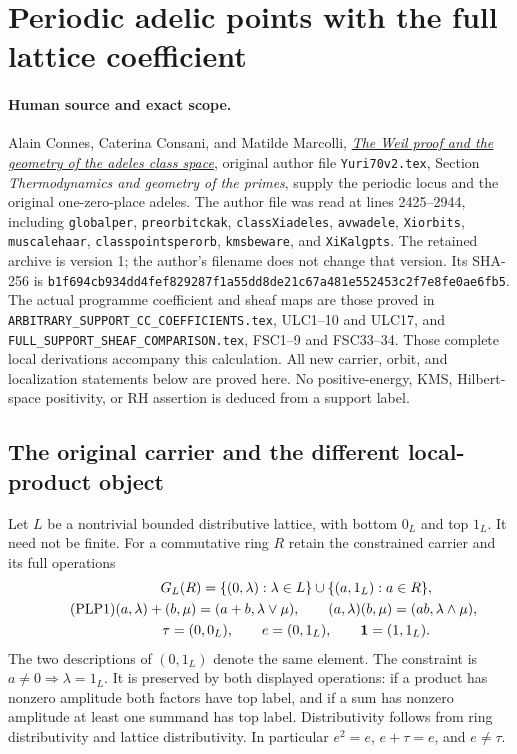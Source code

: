 \section{Periodic adelic points with the full lattice coefficient}
\label{sec:cc-periodic-full-lattice}

{\raggedright
\paragraph{Human source and exact scope.}
Alain Connes, Caterina Consani, and Matilde Marcolli,
\href{https://arxiv.org/abs/math/0703392v1}{\emph{The Weil proof and the
geometry of the adeles class space}}, original author file
\nolinkurl{Yuri70v2.tex}, Section \emph{Thermodynamics and geometry of the
primes}, supply the periodic locus and the original one-zero-place
adeles. The author file was read at lines 2425--2944, including
\texttt{globalper}, \texttt{preorbitckak}, \texttt{classXiadeles},
\texttt{avwadele}, \texttt{Xiorbits}, \texttt{muscalehaar},
\texttt{classpointsperorb}, \texttt{kmsbeware}, and \texttt{XiKalgpts}.
The retained archive is version 1; the author's filename does not change
that version. Its SHA-256 is
\texttt{b1f694cb934dd4fe\allowbreak{}f829287f1a55dd8d\allowbreak{}e21c67a481e55245\allowbreak{}3c2f7e8fe0ae6fb5}.
The actual programme coefficient and sheaf maps are those proved in
\nolinkurl{ARBITRARY_SUPPORT_CC_COEFFICIENTS.tex}, ULC1--10 and ULC17,
and \nolinkurl{FULL_SUPPORT_SHEAF_COMPARISON.tex}, FSC1--9 and FSC33--34.
Those complete local derivations accompany this calculation. All new
carrier, orbit, and localization statements below are proved here.
No positive-energy, KMS, Hilbert-space positivity, or RH assertion is
deduced from a support label.
\par}
\subsection{The original carrier and the different local-product object}

Let $L$ be a nontrivial bounded distributive lattice, with bottom $0_L$
and top $1_L$. It need not be finite. For a commutative ring $R$ retain
the constrained carrier and its full operations
\begin{equation}\tag{PLP1}
\begin{gathered}
G_L(R)=\{(0,\lambda):\lambda\in L\}\cup
                  \{(a,1_L):a\in R\},\\
(a,\lambda)+(b,\mu)=(a+b,\lambda\vee\mu),\qquad
(a,\lambda)(b,\mu)=(ab,\lambda\wedge\mu),\\
\tau=(0,0_L),\qquad e=(0,1_L),\qquad {\bf1}=(1,1_L).
\end{gathered}
\end{equation}
The two descriptions of $(0,1_L)$ denote the same element.
The constraint is $a\ne0\Rightarrow\lambda=1_L$.
It is preserved by both displayed operations: if a product has
nonzero amplitude both factors have top label, and if a sum has
nonzero amplitude at least one summand has top label. Distributivity
follows from ring distributivity and lattice distributivity. In
particular $e^2=e$, $e+\tau=e$, and $e\ne\tau$.

